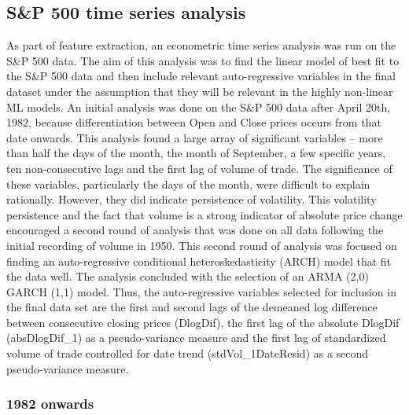 \documentclass[11pt,preprint, authoryear]{elsarticle}
\numberwithin{equation}{section}
\numberwithin{figure}{section}
\numberwithin{table}{section}
\begin{document}
\hypertarget{sp-500-time-series-analysis}{%
\subsection{S\&P 500 time series
analysis}\label{sp-500-time-series-analysis}}

As part of feature extraction, an econometric time series analysis was
run on the S\&P 500 data. The aim of this analysis was to find the
linear model of best fit to the S\&P 500 data and then include relevant
auto-regressive variables in the final dataset under the assumption that
they will be relevant in the highly non-linear ML models. An initial
analysis was done on the S\&P 500 data after April 20th, 1982, because
differentiation between Open and Close prices occurs from that date
onwards. This analysis found a large array of significant variables --
more than half the days of the month, the month of September, a few
specific years, ten non-consecutive lags and the first lag of volume of
trade. The significance of these variables, particularly the days of the
month, were difficult to explain rationally. However, they did indicate
persistence of volatility. This volatility persistence and the fact that
volume is a strong indicator of absolute price change encouraged a
second round of analysis that was done on all data following the initial
recording of volume in 1950. This second round of analysis was focused
on finding an auto-regressive conditional heteroskedasticity (ARCH)
model that fit the data well. The analysis concluded with the selection
of an ARMA (2,0) GARCH (1,1) model. Thus, the auto-regressive variables
selected for inclusion in the final data set are the first and second
lags of the demeaned log difference between consecutive closing prices
(DlogDif), the first lag of the absolute DlogDif (absDlogDif\_1) as a
pseudo-variance measure and the first lag of standardized volume of
trade controlled for date trend (stdVol\_1DateResid) as a second
pseudo-variance measure.

\hypertarget{onwards}{%
\subsubsection{\texorpdfstring{1982 onwards
\label{1982}}{1982 onwards }}\label{onwards}}
\end{document}
